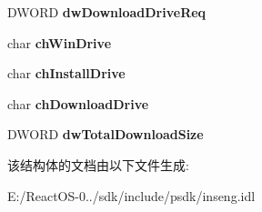\begin{DoxyCompactItemize}
D\+W\+O\+RD {\bfseries dw\+Download\+Drive\+Req}
\item 
\mbox{\label{struct_c_o_m_p_o_n_e_n_t___s_i_z_e_s_ad93aef264f9f9ada6f52b55ba79bec2e}} 
char {\bfseries ch\+Win\+Drive}
\item 
\mbox{\label{struct_c_o_m_p_o_n_e_n_t___s_i_z_e_s_ab8d8d5cae35165c6a47174311d51844b}} 
char {\bfseries ch\+Install\+Drive}
\item 
\mbox{\label{struct_c_o_m_p_o_n_e_n_t___s_i_z_e_s_a8248b048458290f1c17798f3b22dd5bf}} 
char {\bfseries ch\+Download\+Drive}
\item 
\mbox{\label{struct_c_o_m_p_o_n_e_n_t___s_i_z_e_s_a5d5e32b938a00e96d3731b1dae4d33b0}} 
D\+W\+O\+RD {\bfseries dw\+Total\+Download\+Size}
\end{DoxyCompactItemize}


该结构体的文档由以下文件生成\+:\begin{DoxyCompactItemize}
\item 
E\+:/\+React\+O\+S-\/0../sdk/include/psdk/inseng.\+idl\end{DoxyCompactItemize}
